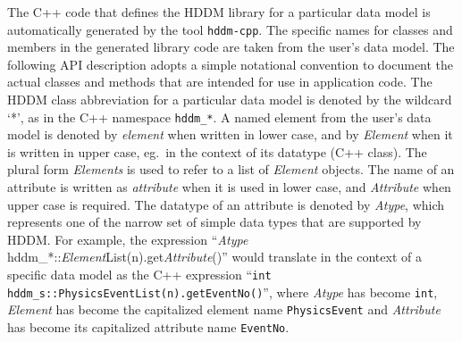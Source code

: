 \documentclass{revtex4}
\begin{document}
The C++ code that defines the HDDM library for a particular data model is
automatically generated by the tool \texttt{hddm-cpp}. The specific names
for classes and members in the generated library code are taken from the
user's data model. The following API description adopts a simple notational
convention to document the actual classes and methods that are intended for
use in application code. The HDDM class abbreviation for a particular data
model is denoted by the wildcard `*', as in the C++ namespace
\texttt{hddm\_*}.
A named element from the user's data model is denoted by {\em element}
when written in lower case, and by {\em Element} when it is written in
upper case, eg.\ in the context of its datatype (C++ class). The plural
form {\em Elements} is used to refer to a list of {\em Element} objects.
The name of an attribute is written as {\em attribute} when it is
used in lower case, and {\em Attribute} when upper case is required.
The datatype of an attribute is denoted by {\em Atype}, which
represents one of the narrow set of simple data types that are supported
by HDDM. For example, the expression 
``{\em Atype} hddm\_*::{\em Element}List(n).get{\em Attribute}()'' would
translate in the context of a specific data model as the C++ expression
``\texttt{int hddm\_s::PhysicsEventList(n).getEventNo()}'', where {\em Atype}
has become \texttt{int}, {\em Element} has become the capitalized 
element name \texttt{PhysicsEvent} and {\em Attribute} has become
its capitalized attribute name \texttt{EventNo}.
\end{document}
